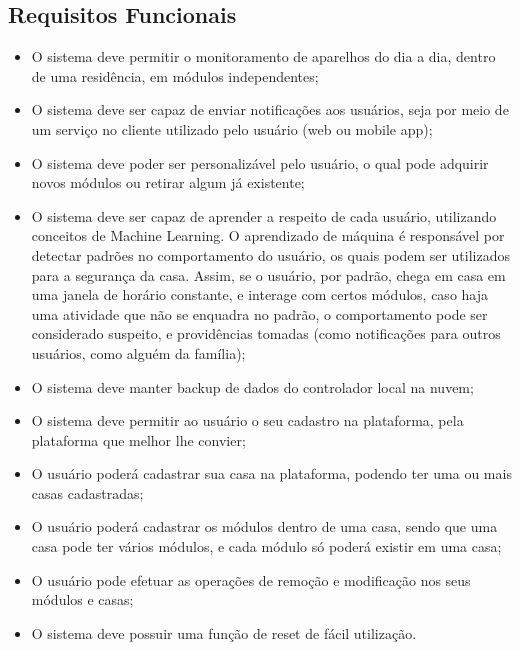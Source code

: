 \subsection{Requisitos Funcionais}
\begin{itemize}
\item O sistema deve permitir o monitoramento de aparelhos do dia a dia, dentro de uma residência, em módulos independentes;
\item O sistema deve ser capaz de enviar notificações aos usuários, seja por meio de um serviço no cliente utilizado pelo usuário (web ou mobile app);
\item O sistema deve poder ser personalizável pelo usuário, o qual pode adquirir novos módulos ou retirar algum já existente;
\item O sistema deve ser capaz de aprender a respeito de cada usuário, utilizando conceitos de Machine Learning. O aprendizado de máquina é responsável por detectar padrões no comportamento do usuário, os quais podem ser utilizados para a segurança da casa. Assim, se o usuário, por padrão, chega em casa em uma janela de horário constante, e interage com certos módulos, caso haja uma atividade que não se enquadra no padrão, o comportamento pode ser considerado suspeito, e providências tomadas (como notificações para outros usuários, como alguém da família);
\item O sistema deve manter backup de dados do controlador local na nuvem;
\item O sistema deve permitir ao usuário o seu cadastro na plataforma, pela plataforma que melhor lhe convier;
\item O usuário poderá cadastrar sua casa na plataforma, podendo ter uma ou mais casas cadastradas;
\item O usuário poderá cadastrar os módulos dentro de uma casa, sendo que uma casa pode ter vários módulos, e cada módulo só poderá existir em uma casa;
\item O usuário pode efetuar as operações de remoção e modificação nos seus módulos e casas;
\item O sistema deve possuir uma função de reset de fácil utilização.
\end{itemize}

